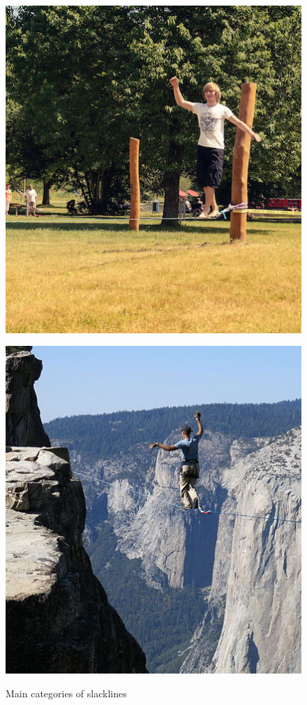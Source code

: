 \begin{figure}[htb]
	\centering
	\begin{minipage}[t]{0.44\linewidth}
		\centering
		\includegraphics[width=0.94\linewidth]{Pictures/3_1_lowline}
		\label{fig:lowline}
	\end{minipage}
	\hfill
	\begin{minipage}[t]{0.44\linewidth}
		\centering
		\includegraphics[width=0.94\linewidth]{Pictures/3_1_highline2}
		\label{fig:highline}
	\end{minipage}
	\caption{Main categories of slacklines}
	\label{fig:lowAndHighline}
\end{figure}

